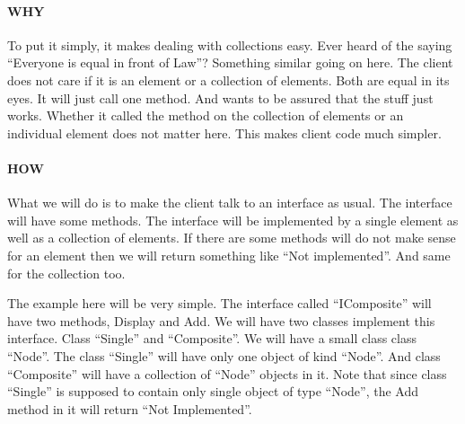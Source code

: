 \documentclass{book}
\begin{document}
\paragraph{WHY}
To put it simply, it makes dealing with collections easy.
Ever heard of the saying “Everyone is equal in front of Law”?
Something similar going on here. The client does not care if it is an element or a collection of elements. Both are equal in its eyes.
It will just call one method. And wants to be assured that the stuff just works.
Whether it called the method on the collection of elements or an individual element does not matter here. This makes client code much simpler.

\paragraph{HOW}
What we will do is to make the client talk to an interface as usual. The interface will have some methods.
The interface will be implemented by a single element as well as a collection of elements.
If there are some methods will do not make sense for an element then we will return something like “Not implemented”. And same for the collection too.

The example here will be very simple. The interface called “IComposite” will have two methods, Display and Add.
We will have two classes implement this interface. Class “Single” and “Composite”.
We will have a small class class “Node”. The class “Single” will have only one object of kind “Node”. And class “Composite” will have a collection of “Node” objects in it.
Note that since class “Single” is supposed to contain only single object of type “Node”, the Add method in it will return “Not Implemented”.
\end{document}
